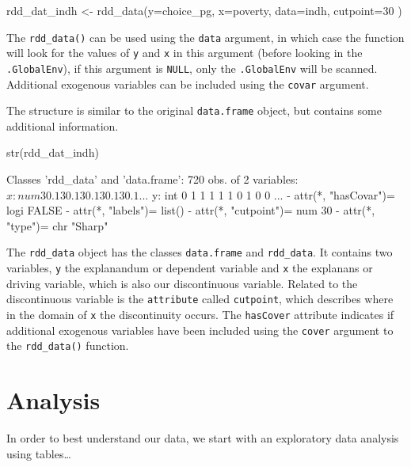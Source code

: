 \documentclass[article]{jss}
\begin{document}
\begin{CodeChunk}
\begin{CodeInput}
rdd_dat_indh <- rdd_data(y=choice_pg,
                         x=poverty,
                         data=indh,
                         cutpoint=30 )
\end{CodeInput}
\end{CodeChunk}

The \texttt{rdd\_data()} can be used using the \texttt{data} argument,
in which case the function will look for the values of \texttt{y} and
\texttt{x} in this argument (before looking in the \texttt{.GlobalEnv}),
if this argument is \texttt{NULL}, only the \texttt{.GlobalEnv} will be
scanned. Additional exogenous variables can be included using the
\texttt{covar} argument.

The structure is similar to the original \texttt{data.frame} object, but
contains some additional information.

\begin{CodeChunk}
\begin{CodeInput}
str(rdd_dat_indh)
\end{CodeInput}
\begin{CodeOutput}
Classes 'rdd_data' and 'data.frame':    720 obs. of  2 variables:
 $ x: num  30.1 30.1 30.1 30.1 30.1 ...
 $ y: int  0 1 1 1 1 1 0 1 0 0 ...
 - attr(*, "hasCovar")= logi FALSE
 - attr(*, "labels")= list()
 - attr(*, "cutpoint")= num 30
 - attr(*, "type")= chr "Sharp"
\end{CodeOutput}
\end{CodeChunk}

The \texttt{rdd\_data} object has the classes \texttt{data.frame} and
\texttt{rdd\_data}. It contains two variables, \texttt{y} the
explanandum or dependent variable and \texttt{x} the explanans or
driving variable, which is also our discontinuous variable. Related to
the discontinuous variable is the \texttt{attribute} called
\texttt{cutpoint}, which describes where in the domain of \texttt{x} the
discontinuity occurs. The \texttt{hasCover} attribute indicates if
additional exogenous variables have been included using the
\texttt{cover} argument to the \texttt{rdd\_data()} function.

\section{Analysis}\label{analysis}

In order to best understand our data, we start with an exploratory data
analysis using tables\ldots{}
\end{document}
